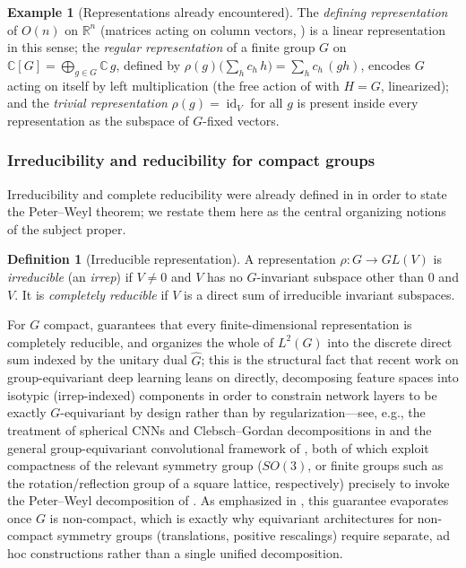 \documentclass[11pt]{article}
\theoremstyle{plain}
\theoremstyle{definition}
\newtheorem{Definition}{Definition}[section]
\newtheorem{Example}{Example}[section]
\begin{document}
\begin{Example}[Representations already encountered]
\label{ex:representations-recap}
The \emph{defining representation} of $O(n)$ on $\mathbb{R}^n$ (matrices
acting on column vectors, ) is a linear
representation in this sense; the \emph{regular representation} of a finite
group $G$ on $\mathbb{C}[G] = \bigoplus_{g \in G} \mathbb{C}\, g$, defined by
$\rho(g)\bigl(\sum_h c_h\, h\bigr) = \sum_h c_h\,(gh)$, encodes $G$ acting on
itself by left multiplication (the free action of
 with $H = G$, linearized); and the
\emph{trivial representation} $\rho(g) = \operatorname{id}_V$ for all $g$ is
present inside every representation as the subspace of $G$-fixed vectors.
\end{Example}

\subsubsection{Irreducibility and reducibility for compact groups}
\label{subsubsec:irreps-recap}

Irreducibility and complete reducibility were already defined in
 in order to state the Peter--Weyl theorem; we
restate them here as the central organizing notions of the subject proper.

\begin{Definition}[Irreducible representation]
\label{def:irrep}
A representation $\rho : G \to GL(V)$ is \emph{irreducible} (an
\emph{irrep}) if $V \neq 0$ and $V$ has no $G$-invariant subspace other than
$0$ and $V$. It is \emph{completely reducible} if $V$ is a direct sum of
irreducible invariant subspaces.
\end{Definition}

For $G$ compact,  guarantees that every
finite-dimensional representation is completely reducible, and organizes the
whole of $L^2(G)$ into the discrete direct sum indexed by the unitary dual
$\widehat{G}$; this is the structural fact that recent work on
group-equivariant deep learning leans on directly, decomposing feature
spaces into isotypic (irrep-indexed) components in order to constrain
network layers to be exactly $G$-equivariant by design rather than by
regularization---see, e.g., the treatment of spherical CNNs and Clebsch--Gordan
decompositions in \citep{kondor2018p3icml} and the general group-equivariant
convolutional framework of \citep{cohen2014}, both of which exploit
compactness of the relevant symmetry group ($SO(3)$, or finite groups such as
the rotation/reflection group of a square lattice, respectively) precisely
to invoke the Peter--Weyl decomposition of . As
emphasized in , this guarantee
evaporates once $G$ is non-compact, which is exactly why equivariant
architectures for non-compact symmetry groups (translations, positive
rescalings) require separate, ad hoc constructions rather than a single
unified decomposition.
\end{document}
